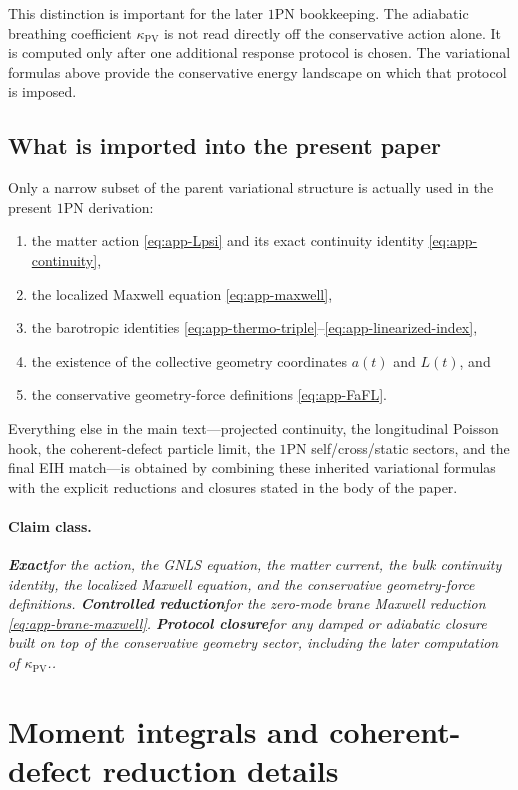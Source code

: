 \documentclass[11pt]{article}
\newcommand{\kPV}{\kappa_{\mathrm{PV}}}
\newcommand{\Exact}{\textbf{Exact}}
\newcommand{\Controlled}{\textbf{Controlled reduction}}
\newcommand{\Protocol}{\textbf{Protocol closure}}
\newcommand{\claimclass}[1]{\paragraph{Claim class.}\emph{#1.}}
\begin{document}
This distinction is important for the later \(1\)PN bookkeeping. The adiabatic breathing
coefficient \(\kPV\) is not read directly off the conservative action alone. It is
computed only after one additional response protocol is chosen. The variational formulas
above provide the conservative energy landscape on which that protocol is imposed.

\subsection{What is imported into the present paper}
\label{app:variational-imported}

Only a narrow subset of the parent variational structure is actually used in the present
\(1\)PN derivation:
\begin{enumerate}[leftmargin=1.5em]
  \item the matter action \eqref{eq:app-Lpsi} and its exact continuity identity
  \eqref{eq:app-continuity},
  \item the localized Maxwell equation \eqref{eq:app-maxwell},
  \item the barotropic identities \eqref{eq:app-thermo-triple}--\eqref{eq:app-linearized-index},
  \item the existence of the collective geometry coordinates \(a(t)\) and \(L(t)\), and
  \item the conservative geometry-force definitions \eqref{eq:app-FaFL}.
\end{enumerate}
Everything else in the main text---projected continuity, the longitudinal Poisson hook,
the coherent-defect particle limit, the \(1\)PN self/cross/static sectors, and the final
EIH match---is obtained by combining these inherited variational formulas with the
explicit reductions and closures stated in the body of the paper.

\claimclass{\Exact for the action, the GNLS equation, the matter current, the bulk
continuity identity, the localized Maxwell equation, and the conservative geometry-force
definitions. \Controlled for the zero-mode brane Maxwell reduction
\eqref{eq:app-brane-maxwell}. \Protocol for any damped or adiabatic closure built on top
of the conservative geometry sector, including the later computation of \(\kPV\).}

\section{Moment integrals and coherent-defect reduction details}
\label{app:moments}
\end{document}

